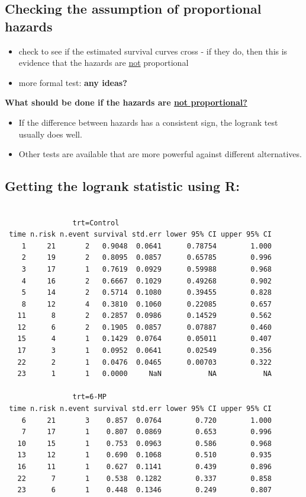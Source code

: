 \documentclass[11pt,slidesonly,semrot,portrait,palatino]{book}
\begin{document}
{\subsection{Checking the assumption of proportional hazards}
\begin{itemize}
\item check to see if the estimated survival curves cross - if they
do, then this is evidence that the hazards are \underline{not} proportional
\item more formal test: {\bf any ideas?}
\end{itemize}
{\bf What should be done if the hazards are \underline{not proportional?}}
\begin{itemize}
\item If the difference between hazards has a consistent sign, the logrank
test usually does well.
\item Other tests are available that are more powerful against different
alternatives.
\end{itemize}
\newpage
\subsection{Getting the logrank statistic using R:}
\begin{verbatim}

                trt=Control
 time n.risk n.event survival std.err lower 95% CI upper 95% CI
    1     21       2   0.9048  0.0641      0.78754        1.000
    2     19       2   0.8095  0.0857      0.65785        0.996
    3     17       1   0.7619  0.0929      0.59988        0.968
    4     16       2   0.6667  0.1029      0.49268        0.902
    5     14       2   0.5714  0.1080      0.39455        0.828
    8     12       4   0.3810  0.1060      0.22085        0.657
   11      8       2   0.2857  0.0986      0.14529        0.562
   12      6       2   0.1905  0.0857      0.07887        0.460
   15      4       1   0.1429  0.0764      0.05011        0.407
   17      3       1   0.0952  0.0641      0.02549        0.356
   22      2       1   0.0476  0.0465      0.00703        0.322
   23      1       1   0.0000     NaN           NA           NA

                trt=6-MP
 time n.risk n.event survival std.err lower 95% CI upper 95% CI
    6     21       3    0.857  0.0764        0.720        1.000
    7     17       1    0.807  0.0869        0.653        0.996
   10     15       1    0.753  0.0963        0.586        0.968
   13     12       1    0.690  0.1068        0.510        0.935
   16     11       1    0.627  0.1141        0.439        0.896
   22      7       1    0.538  0.1282        0.337        0.858
   23      6       1    0.448  0.1346        0.249        0.807
\end{verbatim}

}
\end{document}

